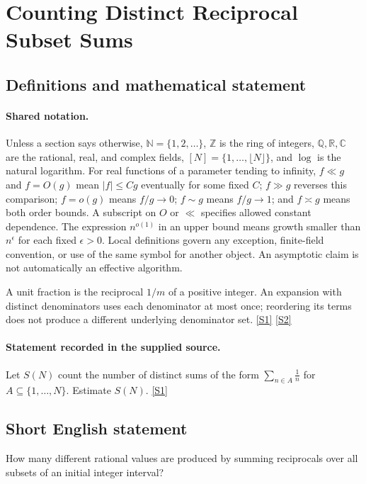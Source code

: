 \documentclass[11pt,a4paper]{article}
\newcommand{\N}{\mathbb{N}}
\newcommand{\Z}{\mathbb{Z}}
\newcommand{\Q}{\mathbb{Q}}
\newcommand{\R}{\mathbb{R}}
\newcommand{\C}{\mathbb{C}}
\newcommand{\sref}[2]{\hyperlink{source:#1:#2}{[S#2]}}
\begin{document}
\section{Counting Distinct Reciprocal Subset Sums}\label{statement}


\subsection{Definitions and mathematical statement}

\paragraph{Shared notation.}Unless a section says otherwise, $\N=\{1,2,\ldots\}$,
$\Z$ is the ring of integers, $\Q,\R,\C$ are the rational, real, and complex
fields, $[N]=\{1,\ldots,\lfloor N\rfloor\}$, and $\log$ is the natural
logarithm. For real functions of a parameter tending to infinity,
$f\ll g$ and $f=O(g)$ mean $|f|\leq Cg$ eventually for some fixed $C$;
$f\gg g$ reverses this comparison; $f=o(g)$ means $f/g\to0$;
$f\sim g$ means $f/g\to1$; and $f\asymp g$ means both order bounds.
A subscript on $O$ or $\ll$ specifies allowed constant dependence.
The expression $n^{o(1)}$ in an upper bound means growth smaller than
$n^\epsilon$ for each fixed $\epsilon>0$. Local definitions govern any
exception, finite-field convention, or use of the same symbol for another
object. An asymptotic claim is not automatically an effective algorithm.



A unit fraction is the reciprocal $1/m$ of a positive integer. An expansion with distinct denominators uses each denominator at most once; reordering its terms does not produce a different underlying denominator set. \sref{statement}{1} \sref{statement}{2}

\paragraph{Statement recorded in the supplied source.}
Let $S(N)$ count the number of distinct sums of the form $\sum_{n\in A}\frac{1}{n}$ for $A\subseteq \{1,\ldots,N\}$. Estimate $S(N)$. \sref{statement}{1}

\subsection{Short English statement}

How many different rational values are produced by summing reciprocals over all subsets of an initial integer interval?
\end{document}
